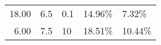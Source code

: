 \documentclass[openany]{article}  %
\begin{document}
\begin{table}
\begin{center}
\begin{tabular}{rrl|ll}
   18.00 &                      6.5 &                    0.1 &  14.96\% &   7.32\% \\
    6.00 &                      7.5 &                     10 &  18.51\% &  10.44\% \\

\end{tabular}
\end{center}
\end{table}
\end{document}
